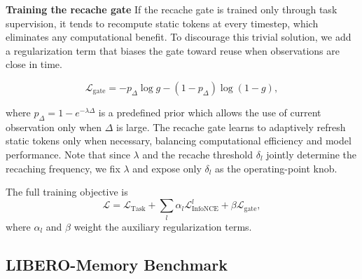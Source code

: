 

\noindent\textbf{Training the recache gate}
If the recache gate is trained only through task supervision, it tends to recompute static tokens at every timestep, which eliminates any computational benefit. To discourage this trivial solution, we add a regularization term that biases the gate toward reuse when observations are close in time.

\begin{equation}
    \mathcal{L}_\text{gate} = -p_\Delta \log g - (1-p_\Delta)\log (1-g),
\end{equation}

where $p_{\Delta} = 1 - e^{-\lambda \Delta}$ is a predefined prior which allows the use of current observation only when $\Delta$ is large. The recache gate learns to adaptively refresh static tokens only when necessary, balancing computational efficiency and model performance. Note that since $\lambda$ and the recache threshold $\delta_l$ jointly determine the recaching frequency, we fix $\lambda$ and expose only $\delta_l$ as the operating-point knob. 

The full training objective is
\begin{equation}
    \mathcal{L} = \mathcal{L}_\text{Task} + \sum_l \alpha_l  \mathcal{L}^l_\text{InfoNCE} + \beta \mathcal{L}_\text{gate},
\end{equation}
where $\alpha_l$ and $\beta$ weight the auxiliary regularization terms.

\subsection{LIBERO-Memory Benchmark}

